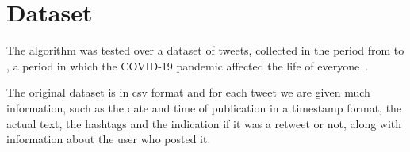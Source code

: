 \section{Dataset} 
\label{sec:ds}
The algorithm was tested over a dataset of  tweets, 
collected in the period from  to ,
a period in which the COVID-19 pandemic affected the life of 
everyone~\cite{dataset:gpreda}.

The original dataset is in csv format and for each tweet we are given much information,
such as the date and time of publication in a timestamp format, 
the actual text, the hashtags and the indication if it was a 
retweet or not, along with information about the user who posted it.

